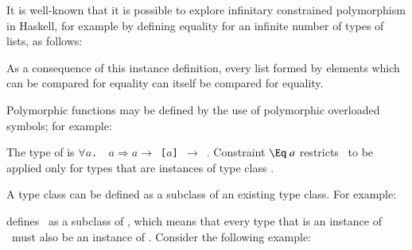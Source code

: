 \documentclass[review]{elsarticle}
\begin{document}

It is well-known that it is possible to explore infinitary constrained
polymorphism in Haskell, for example by defining equality for an
infinite number of types of lists, as follows:

As a consequence of this instance definition, every list formed by
elements which can be compared for equality can itself be compared for
equality.

Polymorphic functions may be defined by the use of polymorphic
overloaded symbols; for example:

The type of {\it \member\/} is {\tt $\forall a$.\,\Eq\ $a\Rightarrow a\!\rightarrow\!$ [$a$] $\!\rightarrow\!$ \Bool}. 
Constraint $\Eq\ a$ restricts \member\ to be applied only
for types that are instances of type class \Eq.

A type class can be defined as a subclass of an existing type
class. For example:

defines \Ord\ as a subclass of \Eq, which means that every type that
is an instance of \Ord\ must also be an instance of \Eq. Consider the
following example:

\end{document}

